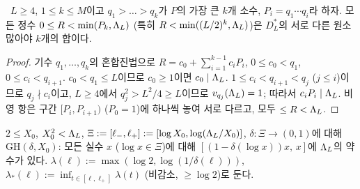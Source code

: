 \begin{lemma}[작은 영역; p1p4 정리 5.7의 $U=\emptyset$ 판의 단순화]\label{STRUCT:lem-small}
\PROVED\ $L\ge4$, $1\le k\le M$이고 $q_1>\dots>q_k$가 $P$의 가장 큰 $k$개 소수, $P_i=q_1\cdots q_i$라 하자. 모든 정수 $0\le R<\min(P_k,\Lambda_L)$ (특히 $R<\min((L/2)^k,\Lambda_L)$)은 $D^*_L$의 서로 다른 원소 많아야 $k$개의 합이다.
\end{lemma}
\begin{proof}
기수 $q_1,\dots,q_k$의 혼합진법으로 $R=c_0+\sum_{i=1}^{k-1}c_iP_i$, $0\le c_0<q_1$, $0\le c_i<q_{i+1}$. $c_0<q_1\le L$이므로 $c_0\ge1$이면 $c_0\mid\Lambda_L$. $1\le c_i<q_{i+1}<q_j$ ($j\le i$)이므로 $q_j\nmid c_i$이고, $L\ge4$에서 $q_j^2>L^2/4\ge L$이므로 $v_{q_j}(\Lambda_L)=1$; 따라서 $c_iP_i\mid\Lambda_L$. 비영 항은 구간 $[P_i,P_{i+1})$ ($P_0=1$)에 하나씩 놓여 서로 다르고, 모두 $\le R<\Lambda_L$.
\end{proof}

\begin{definition}[척도별 간격 가설]\label{STRUCT:def-GH}
$2\le X_0$, $X_0^2<\Lambda_L$, $\Xi:=[\ell_-,\ell_+]:=[\log X_0,\log(\Lambda_L/X_0)]$, $\delta:\Xi\to(0,1)$에 대해
$\mathrm{GH}(\delta,X_0)$: 모든 실수 $x$ ($\log x\in\Xi$)에 대해 $[(1-\delta(\log x))x,\,x]$에 $\Lambda_L$의 약수가 있다.
$\lambda(\ell):=\max(\log2,\log(1/\delta(\ell)))$, $\lambda_*(\ell):=\inf_{t\in[\ell,\ell_+]}\lambda(t)$ (비감소, $\ge\log2$)로 둔다.
\end{definition}

